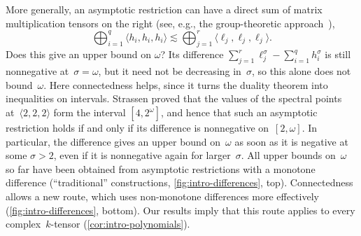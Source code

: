 \documentclass[11pt,letterpaper]{article}
\newcommand{\asympleq}{\lesssim}
\begin{document}
More generally, an asymptotic restriction can have a direct sum of matrix multiplication tensors on the right (see, e.g., the group-theoretic approach~\cite{cohn2003group,cohn2005group}),
\[
\bigoplus_{i=1}^q\langle h_i,h_i,h_i\rangle\asympleq\bigoplus_{j=1}^r\langle \ell_j,\ell_j,\ell_j\rangle.
\]
Does this give an upper bound on $\omega$?
Its difference \(\sum_{j=1}^r\ell_j^\sigma-\sum_{i=1}^qh_i^\sigma\) is still nonnegative at~\(\sigma=\omega\), but it need not be decreasing in~\(\sigma\), so this alone does not bound~\(\omega\). Here connectedness helps, since it turns the duality theorem into inequalities on intervals. Strassen \cite[Corollaries~6.7 and~6.8]{strassen1988asymptotic} proved that the values of the spectral points at~\(\langle2,2,2\rangle\) form the interval \([4,2^\omega]\), and hence that such an asymptotic restriction holds if and only if its difference is nonnegative on~\([2,\omega]\). In particular, the difference gives an upper bound on~\(\omega\) as soon as it is negative at some \(\sigma>2\), even if it is nonnegative again for larger~\(\sigma\). All upper bounds on~\(\omega\) so far have been obtained from asymptotic restrictions with a monotone difference (``traditional'' constructions, \cref{fig:intro-differences}, top). Connectedness allows a new route, which uses non-monotone differences more effectively (\cref{fig:intro-differences}, bottom). Our results imply that this route applies to every complex~\(k\)-tensor (\cref{cor:intro-polynomials}).
\end{document}
